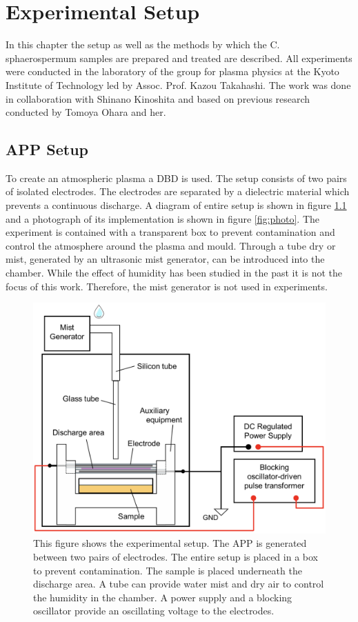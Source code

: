 \chapter{Experimental Setup}
\label{chap:experiment}
In this chapter the setup as well as the methods by which the C. sphaerospermum samples are prepared and treated are described. All experiments were conducted in the laboratory of the group for plasma physics at the Kyoto Institute of Technology led by Assoc. Prof. Kazou Takahashi. The work was done in collaboration with Shinano Kinoshita and based on previous research \cite{kit} conducted by Tomoya Ohara and her.

\section{APP Setup}
To create an atmospheric plasma a DBD is used. The setup consists of two pairs of isolated electrodes. The electrodes are separated by a dielectric material which prevents a continuous discharge. A diagram of entire setup is shown in figure \ref{fig:setup} and a photograph of its implementation is shown in figure \ref{fig:photo}. The experiment is contained with a transparent box to prevent contamination and control the atmosphere around the plasma and mould. Through a tube dry or mist, generated by an ultrasonic mist generator, can be introduced into the chamber. While the effect of humidity has been studied in the past \cite{kit} it is not the focus of this work. Therefore, the mist generator is not used in experiments.
\begin{figure}
    \centering
    \includegraphics[width=.6\textwidth]{images/Process_setup.png}
    \caption[Diagram of the setup]{This figure shows the experimental setup. The APP is generated between two pairs of electrodes. The entire setup is placed in a box to prevent contamination. The sample is placed underneath the discharge area. A tube can provide water mist and dry air to control the humidity in the chamber. A power supply and a blocking oscillator provide an oscillating voltage to the electrodes.}
    \label{fig:setup}
\end{figure}

